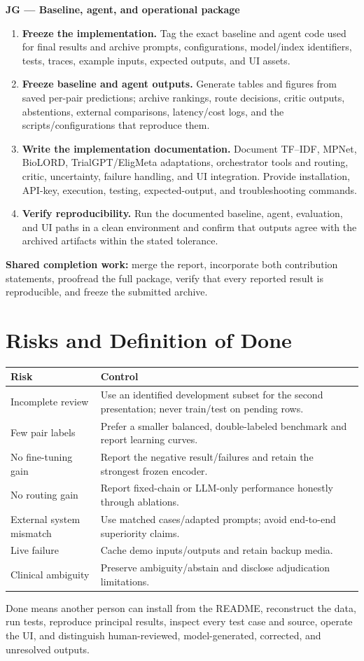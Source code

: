 \documentclass[10pt]{article}
\begin{document}
\textbf{JG --- Baseline, agent, and operational package}
\begin{enumerate}
\item \textbf{Freeze the implementation.} Tag the exact baseline and agent code used for final results and archive prompts, configurations, model/index identifiers, tests, traces, example inputs, expected outputs, and UI assets.
\item \textbf{Freeze baseline and agent outputs.} Generate tables and figures from saved per-pair predictions; archive rankings, route decisions, critic outputs, abstentions, external comparisons, latency/cost logs, and the scripts/configurations that reproduce them.
\item \textbf{Write the implementation documentation.} Document TF--IDF, MPNet, BioLORD, TrialGPT/EligMeta adaptations, orchestrator tools and routing, critic, uncertainty, failure handling, and UI integration. Provide installation, API-key, execution, testing, expected-output, and troubleshooting commands.
\item \textbf{Verify reproducibility.} Run the documented baseline, agent, evaluation, and UI paths in a clean environment and confirm that outputs agree with the archived artifacts within the stated tolerance.
\end{enumerate}

\textbf{Shared completion work:} merge the report, incorporate both contribution statements, proofread the full package, verify that every reported result is reproducible, and freeze the submitted archive.

\section{Risks and Definition of Done}
\begin{longtable}{p{.27\linewidth}p{.64\linewidth}}\toprule Risk & Control\\\midrule
Incomplete review & Use an identified development subset for the second presentation; never train/test on pending rows.\\
Few pair labels & Prefer a smaller balanced, double-labeled benchmark and report learning curves.\\
No fine-tuning gain & Report the negative result/failures and retain the strongest frozen encoder.\\
No routing gain & Report fixed-chain or LLM-only performance honestly through ablations.\\
External system mismatch & Use matched cases/adapted prompts; avoid end-to-end superiority claims.\\
Live failure & Cache demo inputs/outputs and retain backup media.\\
Clinical ambiguity & Preserve ambiguity/abstain and disclose adjudication limitations.\\\bottomrule
\end{longtable}
Done means another person can install from the README, reconstruct the data, run tests, reproduce principal results, inspect every test case and source, operate the UI, and distinguish human-reviewed, model-generated, corrected, and unresolved outputs.
\end{document}
